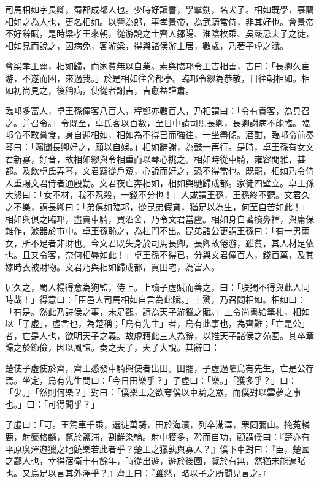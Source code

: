 
\begin{pinyinscope}
司馬相如字長卿，蜀郡成都人也。少時好讀書，學擊劍，名犬子。相如既學，慕藺相如之為人也，更名相如。以訾為郎，事孝景帝，為武騎常侍，非其好也。會景帝不好辭賦，是時梁孝王來朝，從游說之士齊人鄒陽、淮陰枚乘、吳嚴忌夫子之徒，相如見而說之，因病免，客游梁，得與諸侯游士居，數歲，乃著子虛之賦。

會梁孝王薨，相如歸，而家貧無以自業。素與臨邛令王吉相善，吉曰：「長卿久宦游，不遂而困，來過我。」於是相如往舍都亭。臨邛令繆為恭敬，日往朝相如。相如初尚見之，後稱病，使從者謝吉，吉愈益謹肅。

臨邛多富人，卓王孫僮客八百人，程鄭亦數百人，乃相謂曰：「令有貴客，為具召之。并召令。」令既至，卓氏客以百數，至日中請司馬長卿，長卿謝病不能臨。臨邛令不敢嘗食，身自迎相如，相如為不得已而強往，一坐盡傾。酒酣，臨邛令前奏琴曰：「竊聞長卿好之，願以自娛。」相如辭謝，為鼓一再行。是時，卓王孫有女文君新寡，好音，故相如繆與令相重而以琴心挑之。相如時從車騎，雍容閒雅，甚都。及飲卓氏弄琴，文君竊從戶窺，心說而好之，恐不得當也。既罷，相如乃令侍人重賜文君侍者通殷勤。文君夜亡奔相如，相如與馳歸成都。家徒四壁立。卓王孫大怒曰：「女不材，我不忍殺，一錢不分也！」人或謂王孫，王孫終不聽。文君久之不樂，謂長卿曰：「弟俱如臨邛，從昆弟假貣，猶足以為生，何至自苦如此！」相如與俱之臨邛，盡賣車騎，買酒舍，乃令文君當盧。相如身自著犢鼻褌，與庸保雜作，滌器於市中。卓王孫恥之，為杜門不出。昆弟諸公更謂王孫曰：「有一男兩女，所不足者非財也。今文君既失身於司馬長卿，長卿故倦游，雖貧，其人材足依也。且又令客，奈何相辱如此！」卓王孫不得已，分與文君僮百人，錢百萬，及其嫁時衣被財物。文君乃與相如歸成都，買田宅，為富人。

居久之，蜀人楊得意為狗監，侍上。上讀子虛賦而善之，曰：「朕獨不得與此人同時哉！」得意曰：「臣邑人司馬相如自言為此賦。」上驚，乃召問相如。相如曰：「有是。然此乃詩侯之事，未足觀，請為天子游獵之賦。」上令尚書給筆札，相如以「子虛」，虛言也，為楚稱；「烏有先生」者，烏有此事也，為齊難；「亡是公」者，亡是人也，欲明天子之義。故虛藉此三人為辭，以推天子諸侯之苑囿。其卒章歸之於節儉，因以風諫。奏之天子，天子大說。其辭曰：

楚使子虛使於齊，齊王悉發車騎與使者出田。田罷，子虛過嚯烏有先生，亡是公存焉。坐定，烏有先生問曰：「今日田樂乎？」子虛曰：「樂。」「獲多乎？」曰：「少。」「然則何樂？」對曰：「僕樂王之欲夸僕以車騎之眾，而僕對以雲夢之事也。」曰：「可得聞乎？」

子虛曰：「可。王駕車千乘，選徒萬騎，田於海濱，列卒滿澤，罘罔彌山。掩菟轔鹿，射麋格麟，騖於鹽浦，割鮮染輪。射中獲多，矜而自功，顧謂僕曰：『楚亦有平原廣澤遊獵之地饒樂若此者乎？楚王之獵孰與寡人？』僕下車對曰：『臣，楚國之鄙人也，幸得宿衛十有餘年，時從出遊，遊於後園，覽於有無，然猶未能遍睹也。又烏足以言其外澤乎？』齊王曰：『雖然，略以子之所聞見言之。』


\end{pinyinscope}
